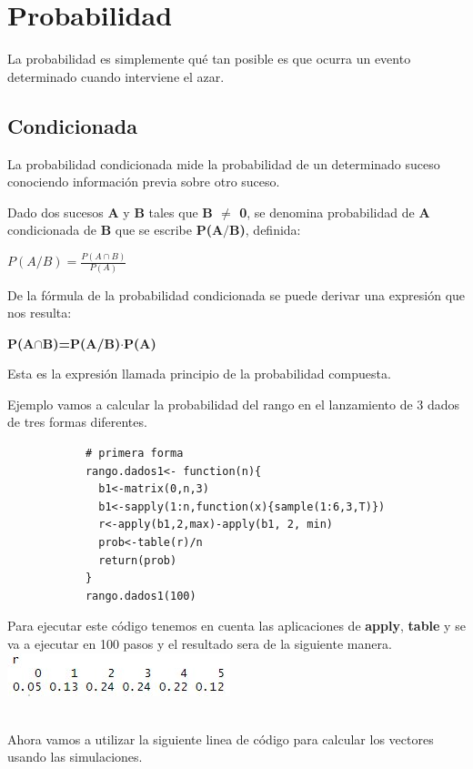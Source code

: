 \documentclass[12pt,hidelinks]{article}
\begin{document}
\section{Probabilidad}
\vspace{10.5cm}
La probabilidad es simplemente qué tan posible es que ocurra un evento determinado cuando interviene el azar.
	\subsection{Condicionada} 
	    La probabilidad condicionada mide la probabilidad de un determinado suceso conociendo información previa sobre otro suceso.
	    
	    Dado dos sucesos \textbf{A} y \textbf{B} tales que \textbf{B $\neq$ 0}, se denomina probabilidad de \textbf{A} condicionada de \textbf{B} que se escribe \textbf{P(A$/$B)}, definida:
	    
	    \begin{center}
	        \textbf{$P(A/B)=\frac{P(A\cap B)}{P(A)}$}
	    \end{center}
	    De la fórmula de la probabilidad condicionada se puede derivar una expresión que nos resulta:
	    \begin{center}
	        \textbf{P(A$\cap$B)=P(A/B)$\cdot$P(A)}
	    \end{center}
	    Esta es la expresión llamada principio de la probabilidad compuesta.
	    
	    Ejemplo vamos a calcular la probabilidad
	    del rango en el lanzamiento de 3 dados de tres formas diferentes.
		\begin{lstlisting}
		    # primera forma
            rango.dados1<- function(n){
              b1<-matrix(0,n,3)
              b1<-sapply(1:n,function(x){sample(1:6,3,T)})
              r<-apply(b1,2,max)-apply(b1, 2, min)
              prob<-table(r)/n
              return(prob)
            }
            rango.dados1(100)
        \end{lstlisting} 
        Para ejecutar este código tenemos en cuenta las aplicaciones de \textbf{apply}, \textbf{table} y se va a ejecutar en 100 pasos y el resultado sera de la siguiente manera.
        \\
            \centering
            \includegraphics[scale=0.4]{probabilidad_condicionada.jpeg}\\
            \centering
            \caption{}\\
        Ahora vamos a utilizar la siguiente linea de código para calcular los vectores usando las simulaciones.\\
            
\end{document}
